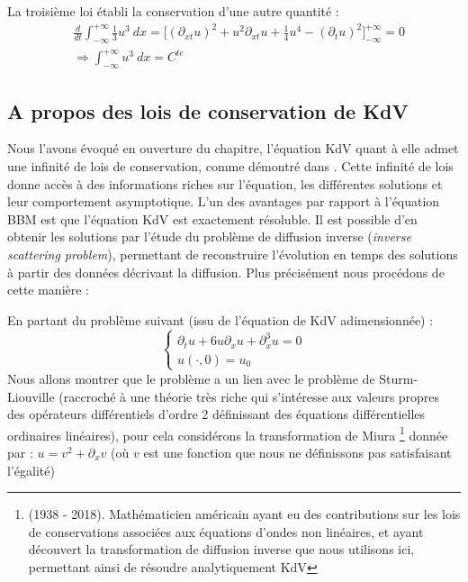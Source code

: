La troisième loi établi la conservation d'une autre quantité :
\begin{equation*}
\begin{split}
    & \frac{d}{dt}\int_{-\infty}^{+\infty} \frac{1}{3}u^3 \ dx = \bigg[ (\partial_{xt}u)^2 + u^2\partial_{xt}u + \frac{1}{4}u^4 - (\partial_tu)^2 \bigg]_{-\infty}^{+\infty} = 0  \\
    & \Rightarrow \int_{-\infty}^{+\infty} u^3 \ dx = C^{te}
\end{split}
\end{equation*}

\subsection{A propos des lois de conservation de KdV}

Nous l'avons évoqué en ouverture du chapitre, l'équation KdV quant à elle admet une infinité de lois de conservation, comme démontré dans \cite{soliton}.
Cette infinité de lois donne accès à des informations riches sur l'équation, les différentes solutions et leur comportement asymptotique. L'un des avantages par rapport à l'équation BBM est que l'équation KdV est exactement résoluble. Il est possible d'en obtenir les solutions par l'étude du problème de diffusion inverse (\textit{inverse scattering problem}), permettant de reconstruire l'évolution en temps des solutions à partir des données décrivant la diffusion.
Plus précisément nous procédons de cette manière :

En partant du problème suivant (issu de l'équation de KdV adimensionnée) :
$$\begin{cases}
    \partial_tu + 6u\partial_xu +\partial_x^3u =0 \\
    u(\cdot,0) = u_0
\end{cases}$$
Nous allons montrer que le problème a un lien avec le problème de Sturm-Liouville (raccroché à une théorie très riche qui s'intéresse aux valeurs propres des opérateurs différentiels d'ordre 2 définissant des équations différentielles ordinaires linéaires), pour cela considérons la transformation de Miura \footnote{(1938 - 2018). Mathématicien américain ayant eu des contributions sur les lois de conservations associées aux équations d'ondes non linéaires, et ayant découvert la transformation de diffusion inverse que nous utilisons ici, permettant ainsi de résoudre analytiquement KdV}
donnée par : $u = v^2 + \partial_xv$ (où $v$ est une fonction que nous ne définissons pas satisfaisant l'égalité)

